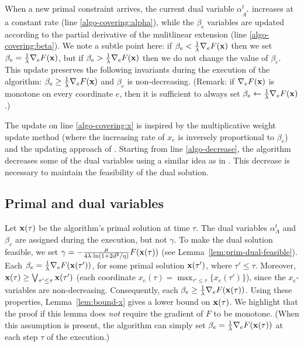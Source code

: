 When a new primal constraint arrives, the current dual variable $\alpha^{t}_{A^*}$ increases at a constant rate (line \ref{algo-covering:alpha}), while the $\beta_e$ variables are updated according to the partial derivative of the mulitlinear extension (line \ref{algo-covering:beta}). We note a subtle point here: if $\beta_e < \frac{1}{\lambda} \nabla_{e} F(\mathbf{x})$ then we set
$\beta_e = \frac{1}{\lambda} \nabla_{e} F(\mathbf{x})$, but if $\beta_e > \frac{1}{\lambda} \nabla_{e} F(\mathbf{x})$ then we do not change the value of $\beta_e$. This update preserves the following invariants during the execution of the algorithm: $\beta_{e} \geq \frac{1}{\lambda} \nabla_{e} F(\mathbf{x})$ and $\beta_{e}$ is non-decreasing. (Remark: if $\nabla_{e} F(\mathbf{x})$ is monotone on every coordinate $e$, then it is sufficient to always set $\beta_{e} \gets \frac{1}{\lambda} \nabla_{e} F(\mathbf{x})$.)

The update on line \ref{algo-covering:x} is inspired by the multiplicative weight update method (where the increasing rate of $x_{e}$
is inversely proportional to $\beta_{e}$) and the updating approach of \cite{BamasMaggiori20:The-Primal-Dual-method}.
Starting from line \ref{algo-decrease}, the algorithm decreases some of the dual variables using a similar idea as in
\cite{AzarBuchbinder16:Online-Algorithms}. This decrease is necessary to maintain the feasibility of the dual solution.

\clearpage
\subsection{Primal and dual variables}
Let $\mathbf{x}(\tau)$ be the algorithm's primal solution at time $\tau$. The dual variables $\alpha^{t}_{A}$ and $\beta_{e}$ are assigned during the execution, but not $\gamma$. To make the dual solution feasible, we set $\gamma = -\frac{\mu}{4\lambda \cdot \ln(1+2d^{2}/\eta)} F(\mathbf{x}(\tau))$ (see Lemma~\ref{lem:prim-dual-feasible}). Each $\beta_{e} = \frac{1}{\lambda} \nabla_{e} F(\mathbf{x}(\tau'))$, for some primal solution $\mathbf{x}(\tau')$, where $\tau' \le \tau$. Moreover, $\mathbf{x}(\tau) \geq \bigvee_{\tau' \le \tau} \mathbf{x}(\tau')$ (each coordinate $x_{e}(\tau) = \max_{\tau' \le \tau}\{x_{e}(\tau')\}$), since the $x_e$-variables are non-decreasing. Consequently, each $\beta_{e} \geq \frac{1}{\lambda} \nabla_{e} F(\mathbf{x}(\tau))$. Using these properties, Lemma~\ref{lem:bound-x} gives a lower bound on $\mathbf{x}(\tau)$. We highlight that the proof if this lemma does \emph{not} require the gradient of $F$ to be monotone.
(When this assumption is present, the algorithm can simply set $\beta_{e} = \frac{1}{\lambda} \nabla_{e} F(\mathbf{x}(\tau))$ at each step $\tau$ of the execution.)


